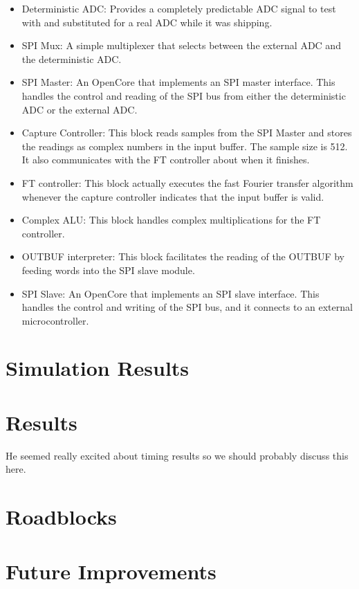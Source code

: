 \documentclass[12pt]{article}
\begin{document}
    \begin{itemize}
      \item Deterministic ADC: Provides a completely predictable ADC signal to test with and substituted for a real ADC while it was shipping.
      \item SPI Mux: A simple multiplexer that selects between the external ADC and the deterministic ADC.
      \item SPI Master: An OpenCore that implements an SPI master interface. This handles the control and reading of the SPI bus from either the deterministic ADC or the external ADC.
      \item Capture Controller: This block reads samples from the SPI Master and stores the readings as complex numbers in the input buffer. The sample size is 512. It also communicates with the FT controller about when it finishes.
      \item FT controller: This block actually executes the fast Fourier transfer algorithm whenever the capture controller indicates that the input buffer is valid.
      \item Complex ALU: This block handles complex multiplications for the FT controller.
      \item OUTBUF interpreter: This block facilitates the reading of the OUTBUF by feeding words into the SPI slave module.
      \item SPI Slave: An OpenCore that implements an SPI slave interface. This handles the control and writing of the SPI bus, and it connects to an external microcontroller.
    \end{itemize}

  \section*{Simulation Results}

  \section*{Results}
    He seemed really excited about timing results so we should probably discuss this here.

  \section*{Roadblocks}

  \section*{Future Improvements}
\end{document}
